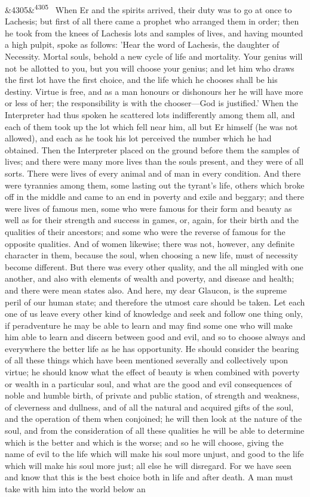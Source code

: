 \documentclass[12pt]{article}
\newcommand{\para}[1][]{\par\noindent\ifx&#1&\else\textsuperscript{\footnotesize #1}~\fi}
\begin{document}
\para[4305] When Er and the spirits arrived, their duty was to go at once to Lachesis; but first of all there came a prophet who arranged them in order; then he took from the knees of Lachesis lots and samples of lives, and having mounted a high pulpit, spoke as follows: 'Hear the word of Lachesis, the daughter of Necessity. Mortal souls, behold a new cycle of life and mortality. Your genius will not be allotted to you, but you will choose your genius; and let him who draws the first lot have the first choice, and the life which he chooses shall be his destiny. Virtue is free, and as a man honours or dishonours her he will have more or less of her; the responsibility is with the chooser---God is justified.' When the Interpreter had thus spoken he scattered lots indifferently among them all, and each of them took up the lot which fell near him, all but Er himself (he was not allowed), and each as he took his lot perceived the number which he had obtained. Then the Interpreter placed on the ground before them the samples of lives; and there were many more lives than the souls present, and they were of all sorts. There were lives of every animal and of man in every condition. And there were tyrannies among them, some lasting out the tyrant's life, others which broke off in the middle and came to an end in poverty and exile and beggary; and there were lives of famous men, some who were famous for their form and beauty as well as for their strength and success in games, or, again, for their birth and the qualities of their ancestors; and some who were the reverse of famous for the opposite qualities. And of women likewise; there was not, however, any definite character in them, because the soul, when choosing a new life, must of necessity become different. But there was every other quality, and the all mingled with one another, and also with elements of wealth and poverty, and disease and health; and there were mean states also. And here, my dear Glaucon, is the supreme peril of our human state; and therefore the utmost care should be taken. Let each one of us leave every other kind of knowledge and seek and follow one thing only, if peradventure he may be able to learn and may find some one who will make him able to learn and discern between good and evil, and so to choose always and everywhere the better life as he has opportunity. He should consider the bearing of all these things which have been mentioned severally and collectively upon virtue; he should know what the effect of beauty is when combined with poverty or wealth in a particular soul, and what are the good and evil consequences of noble and humble birth, of private and public station, of strength and weakness, of cleverness and dullness, and of all the natural and acquired gifts of the soul, and the operation of them when conjoined; he will then look at the nature of the soul, and from the consideration of all these qualities he will be able to determine which is the better and which is the worse; and so he will choose, giving the name of evil to the life which will make his soul more unjust, and good to the life which will make his soul more just; all else he will disregard. For we have seen and know that this is the best choice both in life and after death. A man must take with him into the world below an 
\end{document}
